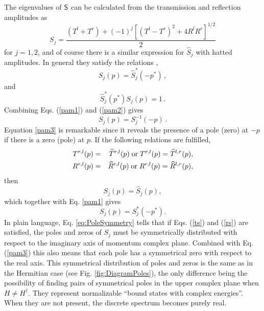 The eigenvalues of $\sf{S}$ can be calculated from the transmission and reflection amplitudes as
%
\begin{equation}
	S_j=\frac{(T^l+T^r)+(-1)^j[(T^l-T^r)^2+4R^lR^r]^{1/2}}{2}
	\label{Sform}
\end{equation}
%
for $j=1,2$, and of course there is a similar expression for $\widehat{S}_j$ with hatted amplitudes.
In general they satisfy the relations \cite{Muga2004},
%
\begin{equation}\label{pam1}
	S_j(p)=\widehat{S}_j^*(-p^*)\,,
\end{equation}
%
and
%
\begin{equation}\label{pam2}
	\widehat{S}_j^*(p^*)S_j(p)=1\,.
\end{equation}
%
Combining Eqs. (\ref{pam1}) and (\ref{pam2}) gives
%
\begin{equation}\label{pam3}
	S_j(p)=S^{-1}_j(-p)\,.
\end{equation}
%
Equation \eqref{pam3} is remarkable since it reveals the presence of a pole (zero) at $-p$ if there is a zero (pole) at $p$.
%
If the following relations are fulfilled,
%
\begin{eqnarray}
	T^{r,l}(p)&=&\widehat{T}^{r,l}(p)\; {\rm or}\; T^{r,l}(p)=\widehat{T}^{l,r}(p),
	\label{ts}
	\\
	R^{r,l}(p)&=&\widehat{R}^{r,l}(p)\; {\rm or}\; R^{r,l}(p)=\widehat{R}^{l,r}(p),
	\label{rs}
\end{eqnarray}
%
then
%
\begin{equation}
	S_j(p)=\widehat{S}_j(p),
\end{equation}
%
which together with Eq. \eqref{pam1} gives
%
\begin{equation}
	S_j(p)=S_j^*(-p^*).
	\label{eq:PoleSymmetry}
\end{equation}
In plain language, Eq. \eqref{eq:PoleSymmetry} tells that if Eqs. (\ref{ts}) and (\ref{rs}) are satisfied,  the poles and zeros of $S_j$ must be symmetrically distributed with respect to the imaginary axis of momentum complex plane. Combined with Eq. (\ref{pam3})
this also means that each pole has a symmetrical zero with respect to the real axis. This symmetrical distribution of poles and zeros is the same as in the Hermitian case (see Fig. \ref{fig:DiagramPoles}),
the only difference being the possibility
of finding pairs of symmetrical poles in the upper complex plane when $H\neq H^\dagger$. They represent normalizable ``bound states
with complex energies''. When they  are not present, the discrete spectrum becomes purely real.

